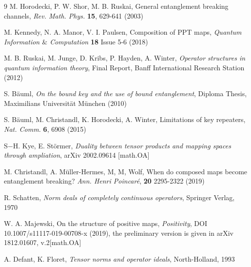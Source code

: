 \documentclass{amsart}
\theoremstyle{plain}
\theoremstyle{definition}
\begin{document}
\begin{thebibliography}{9}
 M. Horodecki, P. W. Shor, M. B. Ruskai, General entanglement breaking channels, \textit{Rev. Math. Phys.} \textbf{15}, 629-641 (2003)

 M. Kennedy, N. A. Manor, V. I. Paulsen, Composition of PPT maps, \textit{Quantum Information $\&$ Computation} \textbf{18} Issue 5-6 (2018)

 M. B. Ruskai, M. Junge, D. Kribs, P. Hayden, A. Winter, \textit{Operator structures in quantum information theory}, Final Report, Banff International Research Station (2012)

 S. B\"auml, \textit{On the bound key and the use of bound entanglement}, Diploma Thesis, Maximilians Universit\"at M\"unchen (2010)

 S. B\"auml, M. Christandl, K. Horodecki, A. Winter, Limitations of key repeaters, \textit{Nat. Comm.} \textbf{6}, 6908 (2015)

 S$-$H. Kye, E. St{\"o}rmer, \textit{Duality between tensor products and mapping spaces through ampliation}, arXiv 2002.09614 [math.OA]

 M. Christandl, A. M{\"u}ller-Hermes, M, M, Wolf, When do composed maps become entanglement breaking? \textit{Ann. Henri Poincar{\'e}}, \textbf{20} 2295-2322 (2019)

 R. Schatten, \textit{Norm deals of completely continuous operators}, Springer Verlag, 1970

 W. A. Majewski, On the structure of positive maps, \textit{Positivity},  DOI 10.1007/s11117-019-00708-x (2019), the preliminary version  is given in arXiv 1812.01607, v.2[math.OA]

 A. Defant, K. Floret, \textit{Tensor norms and operator ideals}, North-Holland, 1993


\end{thebibliography}
\end{document}
